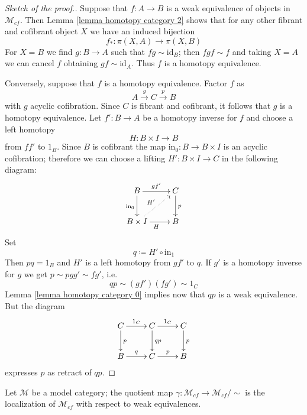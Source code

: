 \begin{refsection}
\begin{proof}[Sketch of the proof.]
Suppose that $f \colon A \to B$ is a weak equivalence of objects in $\mathcal M_{cf}$. Then Lemma \ref{lemma homotopy category 2} shows that for any other fibrant and cofibrant object $X$ we have an induced bijection
\[
f_* \colon \pi(X,A) \to \pi(X,B)
\]
For $X = B$ we find $g \colon B \to A$ such that $fg \sim \mathrm{id}_B$; then $fgf \sim f$ and taking $X = A$ we can cancel $f$ obtaining $gf \sim \mathrm{id}_A$. Thus $f$ is a homotopy equivalence.

Conversely, suppose that $f$ is a homotopy equivalence. Factor $f$ as
\[
A \xrightarrow{g} C \xrightarrow{p} B
\]
with $g$ acyclic cofibration. Since $C$ is fibrant and cofibrant, it follows that $g$ is a homotopy equivalence. Let $f' \colon B \to A$ be a homotopy inverse for $f$ and choose a left homotopy
\[
H \colon B \times I \to B
\]
from $ff'$ to $1_B$. Since $B$ is cofibrant the map $\mathrm{in}_0 \colon B \to B \times I$ is an acyclic cofibration; therefore we can choose a lifting $H' \colon B \times I \to C$ in the following diagram:
\[
\xymatrix{
B \ar[d]_{\mathrm{in}_0} \ar[r]^{gf'} & C \ar[d]^p \\ B \times I \ar@{.>}[ur]^{H'} \ar[r]_H & B
}
\]
Set
\[
q\coloneqq H' \circ \mathrm{in}_1
\]
Then $pq = 1_B$ and $H'$ is a left homotopy from $gf'$ to $q$. If $g'$ is a homotopy inverse for $g$ we get $p \sim pgg' \sim fg'$, i.e.
\[
qp \sim (gf') (fg') \sim 1_C
\]
Lemma \ref{lemma homotopy category 0} implies now that $qp$ is a weak equivalence. But the diagram
\[
\xymatrix{
C \ar[r]^{1_C} \ar[d]^p & C \ar[r]^{1_C} \ar[d]^{qp} & C \ar[d]^p \\ B \ar[r]^q & C \ar[r]^p & B
}
\]
expresses $p$ as retract of $qp$.
\end{proof}

\begin{cor} \label{cor homotopy for fibrant cofibrant}
Let $\mathcal M$ be a model category; the quotient map $\gamma \colon \mathcal M_{cf} \to \mathcal M_{cf} / \sim$ is the localization of $\mathcal M_{cf}$ with respect to weak equivalences.
\end{cor}


\end{refsection}
